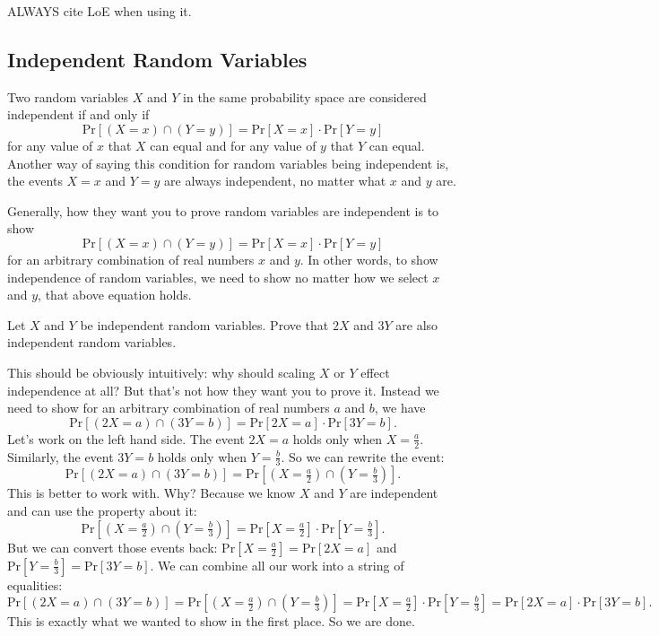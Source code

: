 \documentclass[11pt]{scrartcl}
\begin{document}
\begin{caveat}
ALWAYS cite LoE when using it.
\end{caveat}

\subsection{Independent Random Variables}

Two random variables $X$ and $Y$ in the same probability space are considered independent if and only if \[\text{Pr}[(X = x) \cap (Y = y)] = \text{Pr}[X = x] \cdot \text{Pr}[Y = y]\] for any value of $x$ that $X$ can equal and for any value of $y$ that $Y$ can equal. Another way of saying this condition for random variables being independent is, the events $X = x$ and $Y = y$ are always independent, no matter what $x$ and $y$ are.

Generally, how they want you to prove random variables are independent is to show \[\text{Pr}[(X = x) \cap (Y = y)] = \text{Pr}[X = x] \cdot \text{Pr}[Y = y]\] for an arbitrary combination of real numbers $x$ and $y$. In other words, to show independence of random variables, we need to show no matter how we select $x$ and $y$, that above equation holds.

\begin{example}
Let $X$ and $Y$ be independent random variables. Prove that $2X$ and $3Y$ are also independent random variables.
\end{example}
This should be obviously intuitively: why should scaling $X$ or $Y$ effect independence at all? But that's not how they want you to prove it. Instead we need to show for an arbitrary combination of real numbers $a$ and $b$, we have \[\text{Pr}[(2X = a) \cap (3Y = b)] = \text{Pr}[2X = a] \cdot \text{Pr}[3Y = b].\] Let's work on the left hand side. The event $2X = a$ holds only when $X = \frac{a}{2}$. Similarly, the event $3Y = b$ holds only when $Y = \frac{b}{3}$. So we can rewrite the event: \[\text{Pr}[(2X = a) \cap (3Y = b)] = \text{Pr}[(X = \tfrac{a}{2}) \cap (Y = \tfrac{b}{3})].\] This is better to work with. Why? Because we know $X$ and $Y$ are independent and can use the property about it: \[\text{Pr}[(X = \tfrac{a}{2}) \cap (Y = \tfrac{b}{3})] = \text{Pr}[X = \tfrac{a}{2}] \cdot \text{Pr}[Y = \tfrac{b}{3}].\] But we can convert those events back: $\text{Pr}[X = \tfrac{a}{2}] = \text{Pr}[2X = a]$ and $\text{Pr}[Y = \tfrac{b}{3}] = \text{Pr}[3Y = b]$. We can combine all our work into a string of equalities: \[\text{Pr}[(2X = a) \cap (3Y = b)] = \text{Pr}[(X = \tfrac{a}{2}) \cap (Y = \tfrac{b}{3})] = \text{Pr}[X = \tfrac{a}{2}] \cdot \text{Pr}[Y = \tfrac{b}{3}] = \text{Pr}[2X = a] \cdot \text{Pr}[3Y = b].\] This is exactly what we wanted to show in the first place. So we are done.
\end{document}
